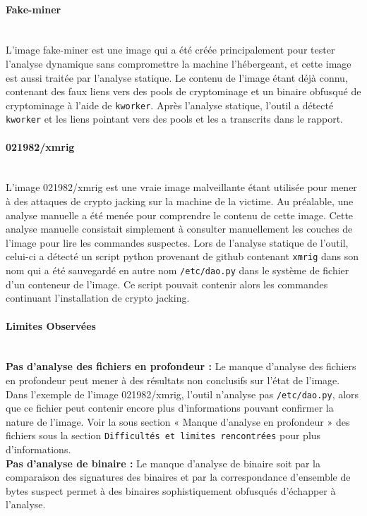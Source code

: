 \noindent \paragraph{Fake-miner} \mbox{} \\
L'image fake-miner est une image qui a été créée principalement pour tester l'analyse dynamique sans compromettre la machine l'hébergeant, et cette image est aussi traitée par l'analyse statique. Le contenu de l'image étant déjà connu, contenant des faux liens vers des pools de cryptominage et un binaire obfusqué de cryptominage à l'aide de \texttt{kworker}. Après l'analyse statique, l'outil a détecté \texttt{kworker} et les liens pointant vers des pools et les a transcrits dans le rapport. 
\noindent \paragraph{021982/xmrig} \mbox{} \\
\noindent L'image 021982/xmrig est une vraie image malveillante étant utilisée pour mener à des attaques de crypto jacking sur la machine de la victime. Au préalable, une analyse manuelle a été menée pour comprendre le contenu de cette image. Cette analyse manuelle consistait simplement à consulter manuellement les couches de l'image pour lire les commandes suspectes. Lors de l'analyse statique de l'outil, celui-ci a détecté un script python provenant de github contenant \texttt{xmrig} dans son nom qui a été sauvegardé en autre nom \texttt{/etc/dao.py} dans le système de fichier d'un conteneur de l'image. Ce script pouvait contenir alors les commandes continuant l'installation de crypto jacking.
\noindent \paragraph{Limites Observées} \mbox{} \\
\noindent \textbf{Pas d'analyse des fichiers en profondeur :} Le manque d'analyse des fichiers en profondeur peut mener à des résultats non conclusifs sur l'état de l'image. Dans l'exemple de l'image 021982/xmrig, l'outil n'analyse pas \texttt{/etc/dao.py}, alors que ce fichier peut contenir encore plus d'informations pouvant confirmer la nature de l'image. Voir la sous section « Manque d'analyse en profondeur » des fichiers sous la section \texttt{Difficultés et limites rencontrées} pour plus d'informations. \\

\noindent \textbf{Pas d'analyse de binaire :} Le manque d'analyse de binaire soit par la comparaison des signatures des binaires et par la correspondance d'ensemble de bytes suspect permet à des binaires sophistiquement obfusqués d'échapper à l'analyse. \\

